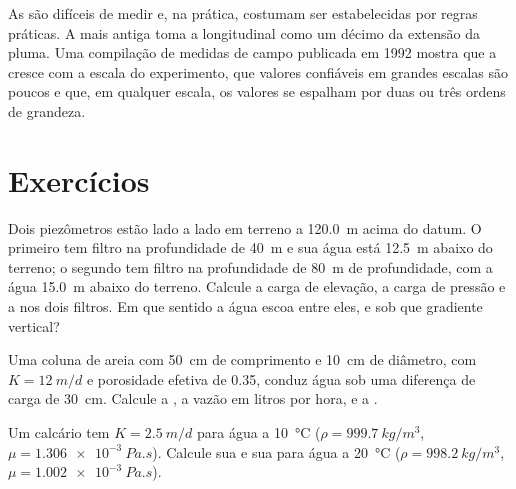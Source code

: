 As  são difíceis de medir e, na prática, costumam ser estabelecidas por
regras práticas. A mais antiga toma a  longitudinal como um décimo da
extensão da pluma. Uma compilação de medidas de campo publicada em
1992 mostra que a  cresce com a escala do experimento,
que valores confiáveis em grandes escalas são poucos e que, em qualquer escala, os
valores se espalham por duas ou três ordens de grandeza.

\section{Exercícios}

\begin{exercise}[$\star$]\label{exo:b3:hydrogeology:1}
Dois piezômetros estão lado a lado em terreno a \qty{120.0}{m} acima do
datum. O primeiro tem filtro na profundidade de \qty{40}{m} e sua água está
\qty{12.5}{m} abaixo do terreno; o segundo tem filtro na profundidade de \qty{80}{m}
de profundidade, com a água \qty{15.0}{m} abaixo do terreno. Calcule a
carga de elevação, a carga de pressão e a  nos dois filtros. Em que
sentido a água escoa entre eles, e sob que gradiente vertical?
\end{exercise}

\begin{exercise}[$\star$]\label{exo:b3:hydrogeology:2}
Uma coluna de areia com \qty{50}{cm} de comprimento e \qty{10}{cm} de diâmetro, com $K =
\qty{12}{m/d}$ e porosidade efetiva de 0.35, conduz água sob uma
diferença de carga de \qty{30}{cm}. Calcule a , a vazão
em litros por hora, e a .
\end{exercise}

\begin{exercise}[$\star$]\label{exo:b3:hydrogeology:3}
Um calcário tem $K = \qty{2.5}{m/d}$ para água a \qty{10}{\celsius}
($\rho = \qty{999.7}{kg/m^3}$, $\mu = \qty{1.306e-3}{Pa.s}$). Calcule sua
 e sua  para água a
\qty{20}{\celsius} ($\rho = \qty{998.2}{kg/m^3}$, $\mu =
\qty{1.002e-3}{Pa.s}$).
\end{exercise}

